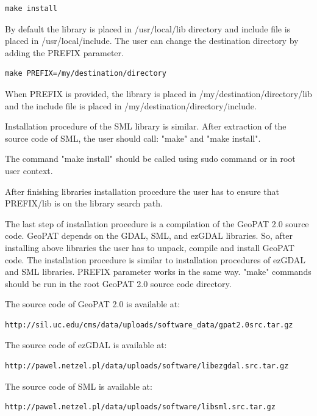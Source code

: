 \documentclass[12pt,margin=0.5in]{article}
\begin{document}
\begin{appendices}
\begin{lstlisting}
make install
\end{lstlisting}

By default the library is placed in /usr/local/lib directory and
include file is placed in /usr/local/include.
The user can change the destination directory by adding the PREFIX parameter.

\begin{lstlisting}
make PREFIX=/my/destination/directory
\end{lstlisting}

When PREFIX is provided, the library is placed in
/my/destination/directory/lib and the include file is placed in
/my/destination/directory/include.

Installation procedure of the SML library is similar. After extraction of the source code of SML, the user should call: "make" and "make install".

The command "make install" should be called using sudo command or in
root user context.

After finishing libraries installation procedure the user has to ensure that
PREFIX/lib is on the library search path.

The last step of installation procedure is a compilation of the GeoPAT 2.0
source code. GeoPAT depends on the GDAL, SML, and ezGDAL libraries.
So, after installing above libraries the user has to unpack, compile
and install GeoPAT code.
The installation procedure is similar to installation procedures of
ezGDAL and SML libraries. PREFIX parameter works in the same way.
"make" commands should be run in the root GeoPAT 2.0 source code
directory.

The source code of GeoPAT 2.0 is available at:

\begin{lstlisting}[frame=single]
http://sil.uc.edu/cms/data/uploads/software_data/gpat2.0src.tar.gz
\end{lstlisting}

The source code of ezGDAL is available at:

\begin{lstlisting}[frame=single]
http://pawel.netzel.pl/data/uploads/software/libezgdal.src.tar.gz
\end{lstlisting}

The source code of SML is available at:

\begin{lstlisting}[frame=single]
http://pawel.netzel.pl/data/uploads/software/libsml.src.tar.gz
\end{lstlisting}


\end{appendices}
\end{document}
